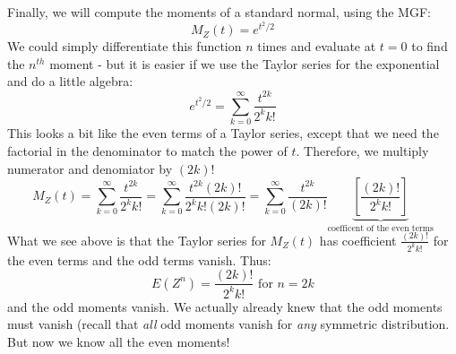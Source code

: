 \documentclass[12pt]{article} %
\begin{document}
Finally, we will compute the moments of a standard normal, using the MGF:
$$M_Z(t) = e^{t^2/2}$$
We could simply differentiate this function $n$ times and evaluate at $t=0$ to find the $n^{th}$ moment - but it is easier if we use the Taylor series for the exponential and do a little algebra:
$$e^{t^2/2} = \sum_{k=0}^\infty \frac{t^{2k}}{2^k k!}$$
This looks a bit like the even terms of a Taylor series, except that we need the factorial in the denominator to match the power of $t$. Therefore, we multiply numerator and denomiator by $(2k)!$
$$M_Z(t) = \sum_{k=0}^\infty \frac{t^{2k}}{2^k k!} = \sum_{k=0}^\infty \frac{t^{2k}(2k)!}{2^k k!(2k)!} = \sum_{k=0}^\infty \frac{t^{2k}}{(2k)!}\underbrace{\left[\frac{(2k)!}{2^k k!}\right]}_{\text{coefficent of the even terms}}$$
What we see above is that the Taylor series for $M_Z(t)$ has coefficient $\frac{(2k)!}{2^k k!}$ for the even terms and the odd terms vanish. Thus:
$$E(Z^n) =  \frac{(2k)!}{2^k k!} \textrm{ for } n = 2k$$
and the odd moments vanish. We actually already knew that the odd moments must vanish (recall that \emph{all} odd moments vanish for \emph{any} symmetric distribution. But now we know all the even moments!
\end{document}

